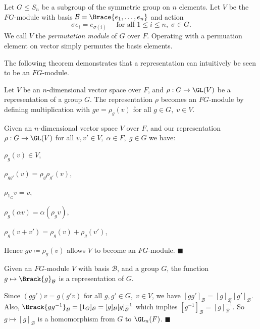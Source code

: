 \documentclass[../Project.tex]{subfiles}
\begin{document}
\begin{defi}
	Let $G \leqslant S_n$ be a subgroup of the symmetric group on $n$ elements. Let $V$ be the $FG$-module with basis $\mathcal{B} = \Brace{e_1,\dots,e_n}$ and action
	$$\sigma e_i = e_{\sigma(i)} \quad \text{ for all } 1 \leqslant i \leqslant n,\;\sigma \in G.$$
	We call $V$ the \textit{permutation module} of $G$ over $F$. Operating with a permuation element on vector simply permutes the basis elements.
\end{defi}

The following theorem demonstrates that a representation can intuitively be seen to be an $FG$-module.

\begin{theo}[{\cite[Theorems 4.4(1)]{2}}]
\label{meh1}
	Let $V$ be an $n$-dimensional vector space over $F$, and $\rho : G \to \GL(V)$ be a representation of a group $G$. The representation $\rho$ becomes an $FG$-module by defining multiplication with $gv = \rho_g(v)$ for all $g\in G,\;v \in V$.
\end{theo}

\begin{proo*}
	Given an $n$-dimensional vector space $V$ over $F$, and our representation $\rho : G \to \GL(V)$ for all $v,v' \in V,\; \alpha \in F,\; g \in G$ we have:
	\begin{menum}
		\item $\rho_g(v) \in V$,
		\item $\rho_{gg'}(v) = \rho_g\rho_{g'}(v)$,
		\item $\rho_{1_G}{v} = v$, 
		\item $\rho_g(\alpha v) = \alpha(\rho_g v)$,
		\item $\rho_g(v + v') = \rho_g(v) + \rho_g(v')$,
	\end{menum}
	Hence $gv \coloneqq \rho_g(v)$ allows $V$ to become an $FG$-module. \hfill$\blacksquare$
\end{proo*}

\begin{theo}[{\cite[Theorems 4.4(2)]{2}}]
\label{meh2}
	Given an $FG$-module $V$ with basis $\mathcal{B}$, and a group $G$, the function $g \mapsto \Brack{g}_\mathcal{B}$ is a representation of $G$.
\end{theo}
\begin{proo*}[{\cite[Theorems 4.4(2)]{2}}]
	Since $(gg')v = g(g'v)$ for all $g,g' \in G,\;v \in V$, we have $[gg']_\mathcal{B} = [g]_\mathcal{B}[g']_\mathcal{B}$. Also, $\Brack{gg^{-1}}_\mathcal{B} = [1_G]_\mathcal{B} = [g]_\mathcal{B}[g]_\mathcal{B}^{-1}$ which implies $[g^{-1}]_\mathcal{B} = [g]^{-1}_\mathcal{B}$. So $g \mapsto [g]_\mathcal{B}$ is a homomorphism from $G$ to $\GL_n(F)$. \hfill$\blacksquare$
\end{proo*}
\end{document}
